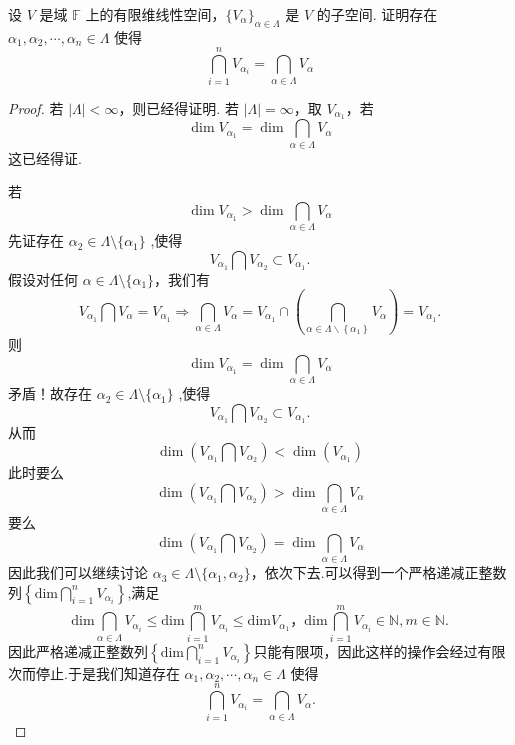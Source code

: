 \documentclass[../../main.tex]{subfiles}
\begin{document}
\begin{proposition}\label{proposition:无穷多个线性子空间的交等于有限个的交}
设 \( V \) 是域 \( \mathbb{F} \) 上的有限维线性空间，\(\{V_{\alpha}\}_{\alpha \in \Lambda}\) 是 \( V \) 的子空间. 证明存在 \(\alpha_1, \alpha_2, \cdots, \alpha_n \in \Lambda\) 使得
\[
\bigcap_{i = 1}^n V_{\alpha_i} = \bigcap_{\alpha \in \Lambda} V_{\alpha}
\]
\end{proposition}
\begin{proof}
若 \(|\Lambda| < \infty\)，则已经得证明. 若 \(|\Lambda| = \infty\)，取 \(V_{\alpha_1}\)，若
\[
\dim V_{\alpha_1} = \dim \bigcap_{\alpha \in \Lambda} V_{\alpha}
\]
这已经得证.

若
\[
\dim V_{\alpha_1} > \dim \bigcap_{\alpha \in \Lambda} V_{\alpha}
\]
先证存在 \(\alpha_2 \in \Lambda \setminus \{\alpha_1\}\) ,使得
\[
V_{\alpha_1} \bigcap V_{\alpha_2} \subset V_{\alpha_1}.
\]
假设对任何 \(\alpha \in \Lambda \setminus \{\alpha_1\}\)，我们有
\[
V_{\alpha_1} \bigcap V_{\alpha} = V_{\alpha_1}\Longrightarrow \bigcap_{\alpha \in \Lambda}{V_{\alpha}}=V_{\alpha _1}\cap \left( \bigcap_{\alpha \in \Lambda \backslash \left\{ \alpha _1 \right\}}{V_{\alpha}} \right) =V_{\alpha _1}.
\]
则
\[
\dim V_{\alpha_1} = \dim \bigcap_{\alpha \in \Lambda} V_{\alpha}
\]
矛盾！故存在 \(\alpha_2 \in \Lambda \setminus \{\alpha_1\}\) ,使得
\[
V_{\alpha_1} \bigcap V_{\alpha_2} \subset V_{\alpha_1}.
\]
从而
\[
\dim \left( V_{\alpha_1} \bigcap V_{\alpha_2} \right) < \dim \left( V_{\alpha_1} \right)
\]
此时要么
\[
\dim \left( V_{\alpha_1} \bigcap V_{\alpha_2} \right) > \dim \bigcap_{\alpha \in \Lambda} V_{\alpha}
\]
要么
\[
\dim \left( V_{\alpha_1} \bigcap V_{\alpha_2} \right) = \dim \bigcap_{\alpha \in \Lambda} V_{\alpha}
\]
因此我们可以继续讨论 \(\alpha_3 \in \Lambda \setminus \{\alpha_1, \alpha_2\}\)，依次下去.可以得到一个严格递减正整数列$\left\{ \mathrm{dim}\bigcap_{i=1}^n{V_{\alpha _i}} \right\} $,满足
\[
\mathrm{dim}\bigcap_{\alpha \in \Lambda}{V_{\alpha _i}}\leqslant \mathrm{dim}\bigcap_{i=1}^m{V_{\alpha _i}}\leqslant \mathrm{dim}V_{\alpha _1}，\mathrm{dim}\bigcap_{i=1}^m{V_{\alpha _i}}\in \mathbb{N},m\in \mathbb{N}.
\]
因此严格递减正整数列$\left\{ \mathrm{dim}\bigcap_{i=1}^n{V_{\alpha _i}} \right\}$只能有限项，因此这样的操作会经过有限次而停止.于是我们知道存在 \(\alpha_1, \alpha_2, \cdots, \alpha_n \in \Lambda\) 使得
\[
\bigcap_{i = 1}^n V_{\alpha_i} = \bigcap_{\alpha \in \Lambda} V_{\alpha}.
\]
\end{proof}
\end{document}
